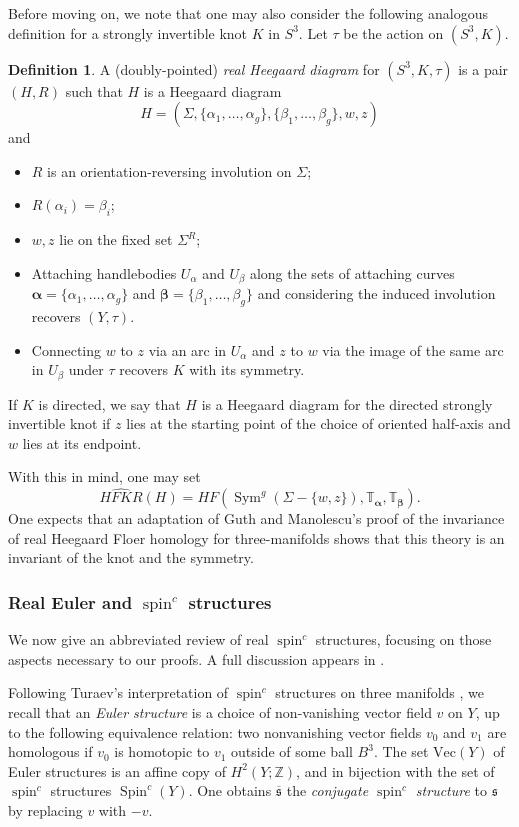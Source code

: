\documentclass[11pt,reqno]{amsart}
\theoremstyle{definition}
\newtheorem{define}[thm]{Definition}
\theoremstyle{remark}
\newcommand{\T}{\mathbb{T}}
\DeclareMathOperator{\spin}{{spin}}
\DeclareMathOperator{\Spin}{{Spin}}
\DeclareMathOperator{\Sym}{{Sym}}
\newcommand{\alphas}{\boldsymbol \alpha}
\newcommand{\betas}{\boldsymbol \beta}
\newcommand{\HF}{\mathit{HF}}
\newcommand \HFKR{ \widehat{\mathit{HFKR}}}
\numberwithin{equation}{section}
\begin{document}
Before moving on, we note that one may also consider the following analogous definition for a strongly invertible knot $K$ in $S^3$. Let $\tau$ be the action on $(S^3,K)$.

\begin{define} A (doubly-pointed) \emph{real Heegaard diagram} for $(S^3, K, \tau)$ is a pair $(H, R)$ such that $H$ is a Heegaard diagram \[H = (\Sigma, \{\alpha_1, \dots, \alpha_g\}, \{\beta_1, \dots, \beta_g\}, w, z)\] and
%
\begin{itemize}
\item $R$ is an orientation-reversing involution on $\Sigma$;
\item $R(\alpha_i) =\beta_i$;
\item $w,z$ lie on the fixed set $\Sigma^R$;
\item Attaching handlebodies $U_{\alpha}$ and $U_{\beta}$ along the sets of attaching curves $\alphas = \{\alpha_1, \dots, \alpha_g\}$ and $\betas = \{\beta_1, \dots, \beta_g\}$ and considering the induced involution recovers $(Y, \tau)$.
\item Connecting $w$ to $z$ via an arc in $U_{\alpha}$ and $z$ to $w$ via the image of the same arc in $U_{\beta}$ under $\tau$ recovers $K$ with its symmetry.
\end{itemize}
%
If $K$ is directed, we say that $H$ is a Heegaard diagram for the directed strongly invertible knot if $z$ lies at the starting point of the choice of oriented half-axis and $w$ lies at its endpoint.
\end{define}

With this in mind, one may set
%
\[\HFKR(H) =  \HF(\Sym^g(\Sigma -\{w,z\}), \T_{\alphas}, \T_{\betas}). \]
%
One expects that an adaptation of Guth and Manolescu's proof of the invariance of real Heegaard Floer homology for three-manifolds shows that this theory is an invariant of the knot and the symmetry.


\subsubsection{Real Euler and $\spin^c$ structures} We now give an abbreviated review of real $\spin^c$ structures, focusing on those aspects necessary to our proofs. A full discussion appears in \cite[Section 3.5]{GM:real}. 

Following Turaev's interpretation of $\spin^c$ structures on three manifolds \cite{Turaev:torsion}, we recall that an \emph{Euler structure} is a choice of non-vanishing vector field $v$ on $Y$, up to the following equivalence relation: two nonvanishing vector fields $v_0$ and $v_1$ are homologous if $v_0$ is homotopic to $v_1$ outside of some ball $B^3$. The set $\mathrm{Vec}(Y)$ of Euler structures is an affine copy of $H^2(Y; \mathbb Z)$, and in bijection with the set of $\spin^c$ structures $\Spin^c(Y)$. One obtains $\overline{\mathfrak s}$ the \emph{conjugate $\spin^c$ structure} to $\mathfrak s$ by replacing $v$ with $-v$.
\end{document}
